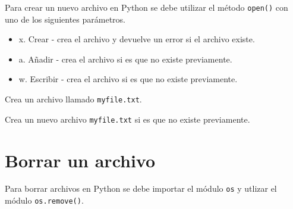 Para crear un nuevo archivo en Python se debe utilizar el método \texttt{open()} con uno de los siguientes parámetros.

\begin{itemize}
  \item \textquotesingle x\textquotesingle. Crear - crea el archivo y devuelve un error si el archivo existe.
  \item \textquotesingle a\textquotesingle. Añadir - crea el archivo si es que no existe previamente.
  \item \textquotesingle w\textquotesingle. Escribir - crea el archivo si es que no existe previamente.
\end{itemize}

\begin{code} Crea un archivo llamado \texttt{myfile.txt}.
\begin{Shaded}
\begin{Highlighting}[]
\OperatorTok{=} \NormalTok{(}\NormalTok{, }\NormalTok{)}
\end{Highlighting}
\end{Shaded}
\end{code}

\begin{code} Crea un nuevo archivo \texttt{myfile.txt} si es que no existe previamente.

\begin{Shaded}
\begin{Highlighting}[]
\OperatorTok{=} \NormalTok{(}\NormalTok{, }\NormalTok{)}
\end{Highlighting}
\end{Shaded}
\end{code}

\section{Borrar un archivo}

Para borrar archivos en Python se debe importar el módulo \texttt{os} y
utlizar el módulo \texttt{os.remove()}. \\

